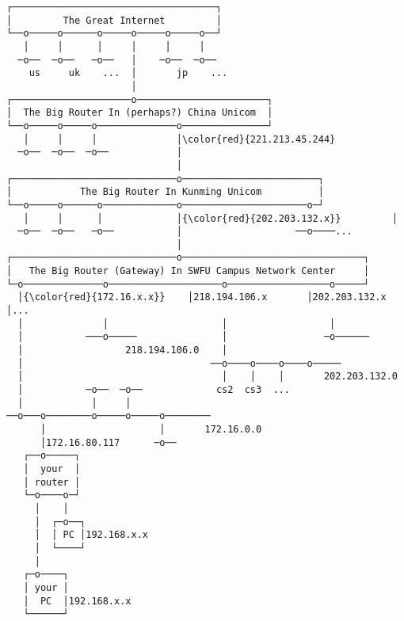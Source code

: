 \documentclass[varwidth=42em,crop]{standalone}
\begin{document}
\begin{Verbatim}[commandchars=\\\{\}]
┌────────────────────────────────────┐
│         The Great Internet         │
└──o─────o──────o─────o─────o─────o──┘
   │     │      │     │     │     │
  ─o──  ─o──   ─o──   │    ─o──  ─o──
    us     uk    ...  │       jp    ...
                      │
┌─────────────────────o───────────────────────┐
│  The Big Router In (perhaps?) China Unicom  │
└──o─────o─────o──────────────o───────────────┘
   │     │     │              │\color{red}{221.213.45.244}
  ─o──  ─o──  ─o──            │
                              │
┌─────────────────────────────o────────────────────────┐
│            The Big Router In Kunming Unicom          │
└──o─────o──────o─────────────o──────────────────────o─┘
   │     │      │             │{\color{red}{202.203.132.x}}         │
  ─o──  ─o──   ─o──           │                    ──o────...
                              │
┌─────────────────────────────o────────────────────────────────┐
│   The Big Router (Gateway) In SWFU Campus Network Center     │
└─o──────────────o────────────────────o──────────────────o─────┘
  │{\color{red}{172.16.x.x}}    │218.194.106.x       │202.203.132.x     │...
  │              │                    │                  │
  │           ───o─────               │                 ─o──────
  │                  218.194.106.0    │
  │                                 ──o────o────o────o─────
  │                                   │    │    │       202.203.132.0
  │           ─o──  ─o──             cs2  cs3  ...
  │            │     │
──o───o────────o─────o─────o────────
      │                    │       172.16.0.0
      │172.16.80.117      ─o──
   ┌──o─────┐
   │  your  │
   │ router │
   └─o────o─┘
     │    │
     │  ┌─o──┐
     │  │ PC │192.168.x.x
     │  └────┘
     │
   ┌─o────┐
   │ your │
   │  PC  │192.168.x.x
   └──────┘
\end{Verbatim}
\end{document}

